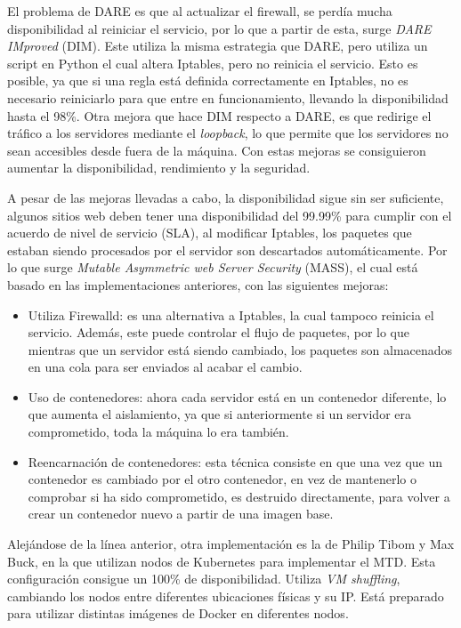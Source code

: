 El problema de DARE es que al actualizar el firewall, se perdía mucha disponibilidad al reiniciar el servicio, por lo que a partir de esta, surge \textit{DARE IMproved} (DIM). Este utiliza la misma estrategia que DARE, pero utiliza un script en Python el cual altera Iptables, pero no reinicia el servicio. Esto es posible, ya que si una regla está definida correctamente en Iptables, no es necesario reiniciarlo para que entre en funcionamiento, llevando la disponibilidad hasta el 98\%. Otra mejora que hace DIM respecto a DARE, es que redirige el tráfico a los servidores mediante el \textit{loopback}, lo que permite que los servidores no sean accesibles desde fuera de la máquina. Con estas mejoras se consiguieron aumentar la disponibilidad, rendimiento y la seguridad.

A pesar de las mejoras llevadas a cabo, la disponibilidad sigue sin ser suficiente, algunos sitios web deben tener una disponibilidad del 99.99\% para cumplir con el acuerdo de nivel de servicio (SLA)\cite{SLA}, al modificar Iptables, los paquetes que estaban siendo procesados por el servidor son descartados automáticamente. Por lo que surge \textit{Mutable Asymmetric web Server Security} (MASS), el cual está basado en las implementaciones anteriores, con las siguientes mejoras:
\begin{itemize}
    \item Utiliza Firewalld\cite{firewalld}: es una alternativa a Iptables, la cual tampoco reinicia el servicio. Además, este puede controlar el flujo de paquetes, por lo que mientras que un servidor está siendo cambiado, los paquetes son almacenados en una cola para ser enviados al acabar el cambio.
    \item Uso de contenedores: ahora cada servidor está en un contenedor diferente, lo que aumenta el aislamiento, ya que si anteriormente si un servidor era comprometido, toda la máquina lo era también.
    \item Reencarnación de contenedores: esta técnica consiste en que una vez que un contenedor es cambiado por el otro contenedor, en vez de mantenerlo o comprobar si ha sido comprometido, es destruido directamente, para volver a crear un contenedor nuevo a partir de una imagen base.
\end{itemize}

Alejándose de la línea anterior, otra implementación es la de Philip Tibom y Max Buck\cite{MTD-gotemburgo}, en la que utilizan nodos de Kubernetes\cite{kubernetes} para implementar el MTD. Esta configuración consigue un 100\% de disponibilidad. Utiliza \textit{VM shuffling}, cambiando los nodos entre diferentes ubicaciones físicas y su IP. Está preparado para utilizar distintas imágenes de Docker en diferentes nodos.

